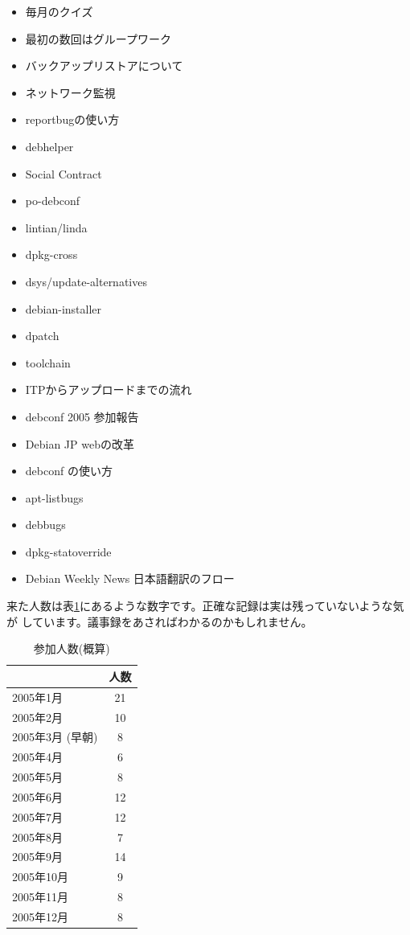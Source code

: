 \documentclass[mingoth,a4paper]{jsarticle}
\newcommand{\tbref}[1]{表\ref{#1}}
\begin{document}
\begin{itemize}
 \item 毎月のクイズ
 \item 最初の数回はグループワーク
 \item バックアップリストアについて
 \item ネットワーク監視
 \item reportbugの使い方
 \item debhelper
 \item Social Contract
 \item po-debconf
 \item lintian/linda
 \item dpkg-cross
 \item dsys/update-alternatives
 \item debian-installer
 \item dpatch
 \item toolchain
 \item ITPからアップロードまでの流れ
 \item debconf 2005 参加報告
 \item Debian JP webの改革
 \item debconf の使い方
 \item apt-listbugs
 \item debbugs
 \item dpkg-statoverride
 \item Debian Weekly News 日本語翻訳のフロー
\end{itemize}

来た人数は\tbref{tab:count}にあるような数字です。正確な記録は実は残っていないような気が
しています。議事録をあさればわかるのかもしれません。

\begin{table}[ht]
 \caption{参加人数(概算)}\label{tab:count}
 \begin{center}
  \begin{tabular}{|l|c|}
   & 人数 \\
 \hline
   2005年1月 & 21 \\
   2005年2月 & 10 \\
   2005年3月 (早朝)& 8\\
   2005年4月 & 6\\
   2005年5月 & 8\\
   2005年6月 & 12\\
   2005年7月 & 12\\
   2005年8月 & 7\\
   2005年9月 & 14\\
   2005年10月 & 9\\
   2005年11月 & 8\\
   2005年12月 & 8 \\
  \end{tabular}
 \end{center}
\end{table}
\end{document}
